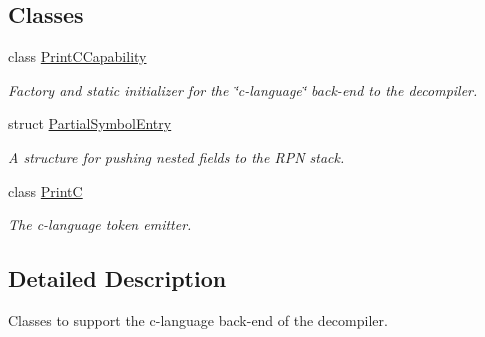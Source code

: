 \subsection*{Classes}
\begin{DoxyCompactItemize}
\item 
class \mbox{\hyperlink{class_print_c_capability}{Print\+C\+Capability}}
\begin{DoxyCompactList}\small\item\em Factory and static initializer for the \char`\"{}c-\/language\char`\"{} back-\/end to the decompiler. \end{DoxyCompactList}\item 
struct \mbox{\hyperlink{struct_partial_symbol_entry}{Partial\+Symbol\+Entry}}
\begin{DoxyCompactList}\small\item\em A structure for pushing nested fields to the R\+PN stack. \end{DoxyCompactList}\item 
class \mbox{\hyperlink{class_print_c}{PrintC}}
\begin{DoxyCompactList}\small\item\em The c-\/language token emitter. \end{DoxyCompactList}\end{DoxyCompactItemize}


\subsection{Detailed Description}
Classes to support the c-\/language back-\/end of the decompiler. 

